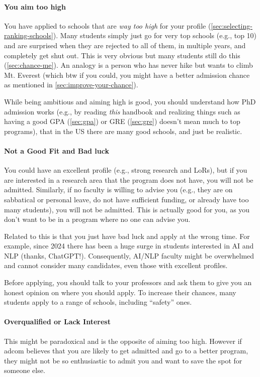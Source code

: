 \documentclass[oneside,11pt,dvipsnames]{book}
\begin{document}
\paragraph{You aim too high} 
You have applied to schools that are \emph{way too high} for your profile (\autoref{sec:selecting-ranking-schools}). Many students simply just go for very top schools (e.g., top 10) and are surprised when they are rejected to all of them, in multiple years, and completely get shut out.  This is very obvious but many students still do this (\autoref{sec:chance-me}). An analogy is a person who has never hike but wants to climb Mt. Everest (which btw if you could, you might have a better admission chance as mentioned in \autoref{sec:improve-your-chance}).

While being ambitious and aiming high is good, you should understand how PhD admission works (e.g., by reading \emph{this} handbook and realizing things such as having a good GPA (\autoref{sec:gpa}) or GRE (\autoref{sec:gre}) doesn't mean much to top programs), that in the US there are many good schools, and just be realistic. 

\paragraph{Not a Good Fit and Bad luck}  You could have an excellent profile (e.g., strong research and LoRs), but if you are interested in a research area that the program does not have, you will not be admitted.
Similarly, if no faculty is willing to advise you (e.g., they are on sabbatical or personal leave, do not have sufficient funding, or already have too many students), you will not be admitted.  This is actually good for you, as you don't want to be in a program where no one can advise you.

Related to this is that you just have bad luck and apply at the wrong time.  For example, since 2024 there has been a huge surge in students interested in AI and NLP (thanks, ChatGPT!). Consequently, AI/NLP faculty might be overwhelmed and cannot consider many candidates, even those with excellent profiles.



Before applying, you should talk to your professors and ask them to give you an honest opinion on where you should apply. To increase their chances, many students apply to a range of schools, including ``safety'' ones. 


\paragraph{Overqualified or Lack Interest}  This might be paradoxical and is the opposite of aiming too high. However if adcom believes that you are likely to get admitted and go to a better program, they might not be so enthusiastic to admit you and want to save the spot for someone else.
\end{document}
